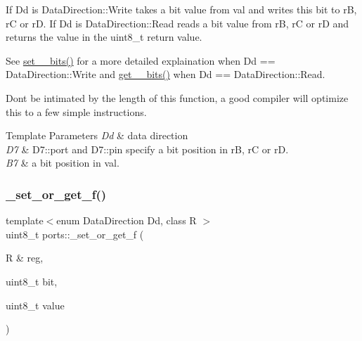 If Dd is Data\+Direction\+::\+Write takes a bit value from {\ttfamily val} and writes this bit to {\ttfamily rB}, {\ttfamily rC} or {\ttfamily rD}. If {\ttfamily Dd} is Data\+Direction\+::\+Read reads a bit value from {\ttfamily rB}, {\ttfamily rC} or {\ttfamily rD} and returns the value in the {\ttfamily uint8\+\_\+t} return value. 

See \hyperlink{namespaceports_aac15fb87d8fede3f2bf8d764ab42965f}{set\+\_\+\_\+bits()} for a more detailed explaination when {\ttfamily Dd} == Data\+Direction\+::\+Write and \hyperlink{namespaceports_a9a1959ec95780c00a964b174a27b2a37}{get\+\_\+\_\+bits()} when {\ttfamily Dd} == Data\+Direction\+::\+Read.

Don\textquotesingle{}t be intimated by the length of this function, a good compiler will optimize this to a few simple instructions.


\begin{DoxyTemplParams}{Template Parameters}
{\em Dd} & data direction \\
\hline
{\em D7} & {\ttfamily D7\+::port} and {\ttfamily D7\+::pin} specify a bit position in {\ttfamily rB}, {\ttfamily rC} or {\ttfamily rD}. \\
\hline
{\em B7} & a bit position in val. \\
\hline
\end{DoxyTemplParams}
\hypertarget{namespaceports_a75686ee2e9a291c0095dec6d73e4af8d}{}\label{namespaceports_a75686ee2e9a291c0095dec6d73e4af8d} 
\subsubsection{\texorpdfstring{\+\_\+set\+\_\+or\+\_\+get\+\_\+f()}{\_set\_or\_get\_f()}}
{\footnotesize\ttfamily template$<$enum Data\+Direction Dd, class R $>$ \\
uint8\+\_\+t ports\+::\+\_\+set\+\_\+or\+\_\+get\+\_\+f (\begin{DoxyParamCaption}\item[{R \&}]{reg,  }\item[{uint8\+\_\+t}]{bit,  }\item[{uint8\+\_\+t}]{value }\end{DoxyParamCaption})\hspace{0.3cm}{\ttfamily [inline]}}



